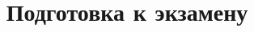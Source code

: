 \documentclass[a4paper]{article}
\begin{document}
  \title{Подготовка к экзамену}
   
\end{document}
